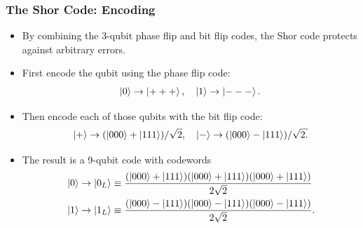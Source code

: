 \documentclass{beamer}
\begin{document}
\begin{frame}
    \frametitle{The Shor Code: Encoding}
    \begin{itemize}
        \item<1-> By combining the 3-qubit phase flip and bit flip codes, the Shor code protects against arbitrary errors.
        \item<2-> First encode the qubit using the phase flip code: $$\left\vert{0}\right\rangle\rightarrow\left\vert{+++}\right\rangle,\quad \left\vert{1}\right\rangle\rightarrow\left\vert{---}\right\rangle.$$
        \item<3-> Then encode each of those qubits with the bit flip code: $$\left\vert{+}\right\rangle\rightarrow (\left\vert{000}\right\rangle+\left\vert{111}\right\rangle)/\sqrt{2},\quad \left\vert{-}\right\rangle\rightarrow (\left\vert{000}\right\rangle-\left\vert{111}\right\rangle)/\sqrt{2.}$$
        \item<4-> The result is a 9-qubit code with codewords 
        \begin{align*}
            & \left\vert{0}\right\rangle \rightarrow \left\vert{0_L}\right\rangle \equiv \frac{(\left\vert{000}\right\rangle + \left\vert{111}\right\rangle)(\left\vert{000}\right\rangle + \left\vert{111}\right\rangle)(\left\vert{000}\right\rangle + \left\vert{111}\right\rangle)}{2\sqrt{2}}\\
            & \left\vert{1}\right\rangle\rightarrow \left\vert{1_L}\right\rangle \equiv \frac{(\left\vert{000}\right\rangle - \left\vert{111}\right\rangle)(\left\vert{000}\right\rangle - \left\vert{111}\right\rangle)(\left\vert{000}\right\rangle - \left\vert{111}\right\rangle)}{2\sqrt{2}}.
        \end{align*}
    \end{itemize}
\end{frame}

    

\end{document}
